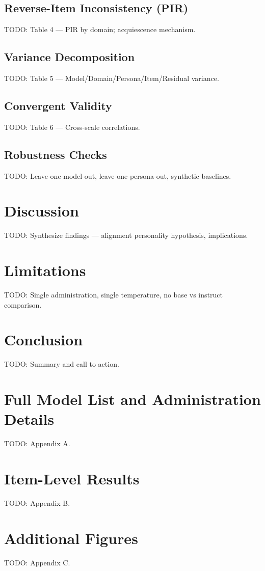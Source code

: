 \documentclass[11pt]{article}
\begin{document}
\subsection{Reverse-Item Inconsistency (PIR)}
TODO: Table 4 — PIR by domain; acquiescence mechanism.

\subsection{Variance Decomposition}
TODO: Table 5 — Model/Domain/Persona/Item/Residual variance.

\subsection{Convergent Validity}
TODO: Table 6 — Cross-scale correlations.

\subsection{Robustness Checks}
TODO: Leave-one-model-out, leave-one-persona-out, synthetic baselines.

\section{Discussion}
TODO: Synthesize findings — alignment personality hypothesis, implications.

\section{Limitations}
TODO: Single administration, single temperature, no base vs instruct comparison.

\section{Conclusion}
TODO: Summary and call to action.




\appendix

\section{Full Model List and Administration Details}
TODO: Appendix A.

\section{Item-Level Results}
TODO: Appendix B.

\section{Additional Figures}
TODO: Appendix C.
\end{document}
